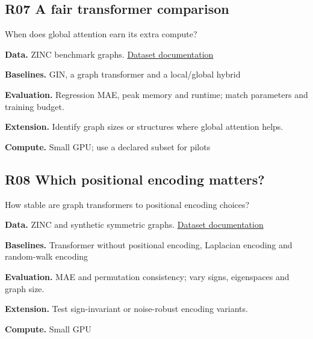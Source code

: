 \documentclass[11pt,letterpaper]{article}
\begin{document}
\begin{minipage}{\linewidth}\subsection*{R07 A fair transformer comparison}
When does global attention earn its extra compute?\par\textbf{Data.} ZINC benchmark graphs. \href{https://pytorch-geometric.readthedocs.io/en/latest/generated/torch_geometric.datasets.ZINC.html}{Dataset documentation}\par
\textbf{Baselines.} GIN, a graph transformer and a local/global hybrid\par
\textbf{Evaluation.} Regression MAE, peak memory and runtime; match parameters and training budget.\par
\textbf{Extension.} Identify graph sizes or structures where global attention helps.\par
\textbf{Compute.} Small GPU; use a declared subset for pilots\par
\end{minipage}\par\vspace{8pt}
\begin{minipage}{\linewidth}\subsection*{R08 Which positional encoding matters?}
How stable are graph transformers to positional encoding choices?\par\textbf{Data.} ZINC and synthetic symmetric graphs. \href{https://pytorch-geometric.readthedocs.io/en/latest/generated/torch_geometric.datasets.ZINC.html}{Dataset documentation}\par
\textbf{Baselines.} Transformer without positional encoding, Laplacian encoding and random-walk encoding\par
\textbf{Evaluation.} MAE and permutation consistency; vary signs, eigenspaces and graph size.\par
\textbf{Extension.} Test sign-invariant or noise-robust encoding variants.\par
\textbf{Compute.} Small GPU\par
\end{minipage}\par\vspace{8pt}
\end{document}
